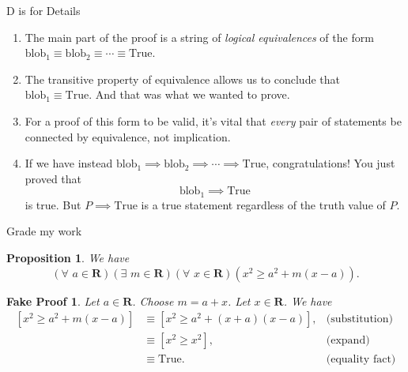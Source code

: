 \documentclass[usenames,dvipsnames,fleqn,leqno,10pt, pdflatex]{beamer}
\newcommand{\reals}{\mathbf{R}}
\newenvironment{PenList}{
  \begin{enumerate}[\textcolor{UNK-blue}{\PencilRightDown}]
    \addtolength{\itemsep}{-0.0\itemsep}}
  {\end{enumerate}}
\newtheorem{myprop}{Proposition}
\newtheorem{fakeproof}{Fake Proof}
\begin{document}
\begin{frame}{D is for Details}

\begin{PenList}
\item The main part of the proof is  a string of \emph{logical equivalences} of the form $\mbox{blob}_1 \equiv \mbox{blob}_2 \equiv \cdots 
\equiv \mbox{True}$.

\item The transitive property  of equivalence allows us to conclude that $\mbox{blob}_1 \equiv \mbox{True}$. And that was what we wanted to prove.

\item For a proof of this form to be valid, it's vital that \emph{every} pair of statements be connected by equivalence, not implication. 

\item If we have instead $\mbox{blob}_1 \implies \mbox{blob}_2 \implies  \cdots \implies \mbox{True}$, congratulations! You just proved that
\begin{equation*}
   \mbox{blob}_1   \implies  \mbox{True}
\end{equation*}
is true.  But $ P \implies \mbox{True}$ is a true statement regardless of the truth value of $P$.  


\end{PenList}
\end{frame}
\begin{frame}{Grade my work}

\begin{myprop} We have
$$
\left(\forall \,\, a \in \reals\right)\left(\exists \,\, m \in \reals\right)\left (\forall \,\, x \in \reals \right) \left(x^2 \geq a^2 + m (x-a) \right).
$$
\end{myprop}

\begin{fakeproof}Let $a \in \reals$. Choose $m = a+x$. Let $x \in \reals$. We have
\begin{align*}
    \left[x^2 \geq a^2 + m (x -a) \right] &\equiv \left[x^2 \geq a^2 + (x+a)  (x -a) \right],
       &\mbox{(substitution)}\\
       &\equiv \left[x^2 \geq x^2 \right], &\mbox{(expand)}\\
       &\equiv \mbox{True}.   &\mbox{(equality fact)}\\
\end{align*}
\end{fakeproof}

\end{frame}
    
\end{document}
